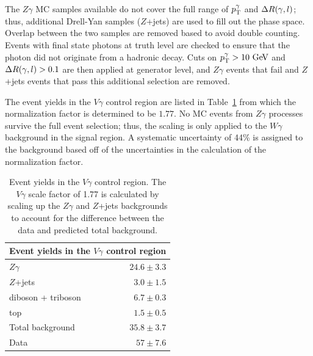 The $Z\gamma$ MC samples available do not cover the full range of $p_{\mathrm{T}}^\gamma$ and $\Delta R(\gamma,l)$; thus, additional Drell-Yan samples ($Z$+jets) are used to fill out the phase space.
Overlap between the two samples are removed based to avoid double counting.
Events with final state photons at truth level are checked to ensure that the photon did not originate from a hadronic decay.
Cuts on $\pt^\gamma > 10\gev$ and $\Delta R(\gamma,l) > 0.1$ are then applied at generator level, and $Z\gamma$ events that fail and $Z$+jets events that pass this additional selection are removed.

The event yields in the $V\gamma$ control region are listed in Table~\ref{tab:ssww13tev_vgamma_numbers} from which the normalization factor is determined to be $1.77$.
No MC events from $Z\gamma$ processes survive the full event selection; thus, the scaling is only applied to the $W\gamma$ background in the signal region.
A systematic uncertainty of 44\% is assigned to the background based off of the uncertainties in the calculation of the normalization factor.

\begin{table}[htbp]
  \centering
  \begin{tabular}{l r}
    \multicolumn{2}{c}{Event yields in the $V\gamma$ control region} \\
    \hline\hline
    $Z\gamma$ & $24.6\pm 3.3$ \\
    $Z$+jets  &  $3.0\pm 1.5$ \\
    diboson + triboson & $6.7\pm 0.3$ \\
    top       &  $1.5\pm 0.5$ \\
    \hline
    Total background & $35.8\pm 3.7$ \\
    Data             & $57 \pm 7.6$ \\
    \hline
  \end{tabular}
  \caption{Event yields in the $V\gamma$ control region.  The $V\gamma$ scale factor of 1.77 is calculated by scaling up the $Z\gamma$ and $Z$+jets backgrounds to account for the difference between the data and predicted total background.}
  \label{tab:ssww13tev_vgamma_numbers}
\end{table}

